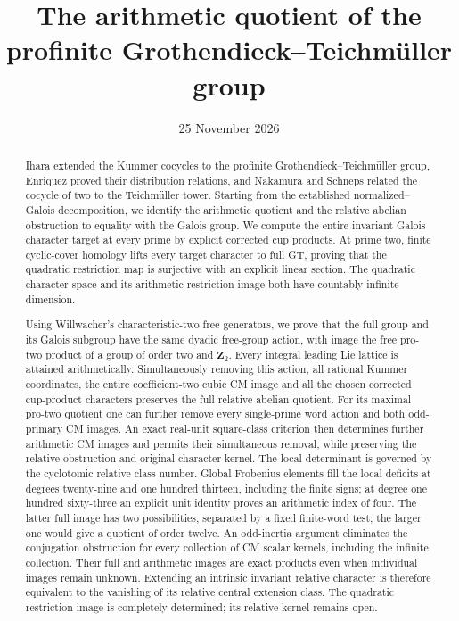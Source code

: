 \documentclass[11pt,a4paper]{article}
\title{The arithmetic quotient of the profinite Grothendieck--Teichm\"uller group}
\author{}
\date{25 November 2026}
\theoremstyle{definition}
\theoremstyle{remark}
\begin{document}
\maketitle
\begin{abstract}
Ihara extended the Kummer cocycles to the profinite Grothendieck--Teichm\"uller group, Enriquez proved their distribution relations, and Nakamura and Schneps related the cocycle of two to the Teichm\"uller tower. Starting from the established normalized--Galois decomposition, we identify the arithmetic quotient and the relative abelian obstruction to equality with the Galois group. We compute the entire invariant Galois character target at every prime by explicit corrected cup products. At prime two, finite cyclic-cover homology lifts every target character to full GT, proving that the quadratic restriction map is surjective with an explicit linear section. The quadratic character space and its arithmetic restriction image both have countably infinite dimension.

Using Willwacher's characteristic-two free generators, we prove that the full group and its Galois subgroup have the same dyadic free-group action, with image the free pro-two product of a group of order two and $\mathbf Z_2$. Every integral leading Lie lattice is attained arithmetically. Simultaneously removing this action, all rational Kummer coordinates, the entire coefficient-two cubic CM image and all the chosen corrected cup-product characters preserves the full relative abelian quotient. For its maximal pro-two quotient one can further remove every single-prime word action and both odd-primary CM images. An exact real-unit square-class criterion then determines further arithmetic CM images and permits their simultaneous removal, while preserving the relative obstruction and original character kernel. The local determinant is governed by the cyclotomic relative class number. Global Frobenius elements fill the local deficits at degrees twenty-nine and one hundred thirteen, including the finite signs; at degree one hundred sixty-three an explicit unit identity proves an arithmetic index of four. The latter full image has two possibilities, separated by a fixed finite-word test; the larger one would give a quotient of order twelve. An odd-inertia argument eliminates the conjugation obstruction for every collection of CM scalar kernels, including the infinite collection. Their full and arithmetic images are exact products even when individual images remain unknown. Extending an intrinsic invariant relative character is therefore equivalent to the vanishing of its relative central extension class. The quadratic restriction image is completely determined; its relative kernel remains open.


\end{abstract}
\end{document}
